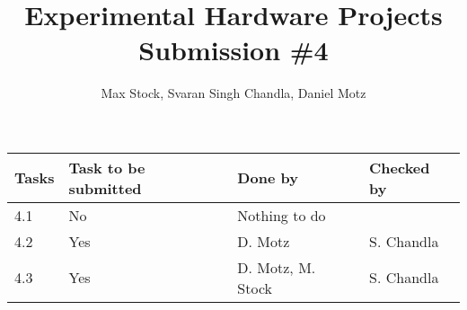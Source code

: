 \documentclass[runningheads]{llncs}
\begin{document}
\newcommand{\hanr}{4}
%
\title{Experimental Hardware Projects Submission \#\hanr}
%
\author{Max Stock, Svaran Singh Chandla, Daniel Motz}
%
%
%
\maketitle
%
%
{\def\arraystretch{2}\tabcolsep=10pt
\begin{tabular}{@{}l | l | l | l @{}}
    Tasks & Task to be submitted & Done by & Checked by \\
    \hline
    \hanr.1 & No  & Nothing to do & \\
    \hanr.2 & Yes & D. Motz & S. Chandla \\
    \hanr.3 & Yes & D. Motz, M. Stock & S. Chandla
\end{tabular}%
}
%
\end{document}
